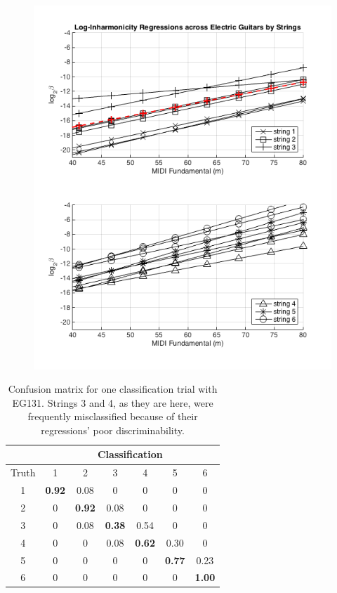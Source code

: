 \documentclass[12pt]{cmuthesis}
\begin{document}
\begin{figure}[!htbp] 
\label{fig:traj-compare-eg}
\centering
\includegraphics[scale=0.75]{traj-compare-eg}
\caption{}
\end{figure}

\begin{table}
\begin{center}
\begin{tabular}{|c||c|c|c|c|c|c|}
\hline
& \multicolumn{6}{|c|}{Classification} \\
\hline
Truth &1	&2	&3	&4	&5	&6\\
\hline
\hline
1	&\bf{0.92}	& 0.08	& 0	& 0	&0	& 0 \\ 
\hline
2	&0	& \bf{0.92}	& 0.08	& 0	&0	& 0 \\
\hline
3	&0	& 0.08	& \bf{0.38}	&0.54	& 0	& 0 \\ 
\hline
4	&0	& 0	& 0.08	&\bf{0.62}	& 0.30	& 0 \\
\hline
5	&0	& 0	& 0	&0	& \bf{0.77}	& 0.23\\ 
\hline
6	&0	& 0	& 0	&0	&0	& \bf{1.00} \\
\hline
\end{tabular}
\caption{Confusion matrix for one classification trial with EG131. Strings 3 and 4, as they are here, were frequently misclassified because of their regressions' poor discriminability.} 
\label{tab:cf-eg}
\end{center}
\end{table}
\end{document}
